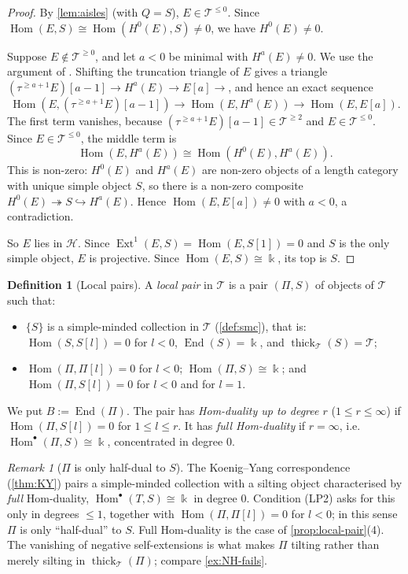 \documentclass[11pt,reqno]{amsart}
\theoremstyle{plain}
\theoremstyle{definition}
\newtheorem{definition}[theorem]{Definition}
\theoremstyle{remark}
\newtheorem{remark}[theorem]{Remark}
\newcommand{\kk}{\Bbbk}
\DeclareMathOperator{\Hom}{Hom}
\DeclareMathOperator{\End}{End}
\DeclareMathOperator{\Ext}{Ext}
\newcommand{\thick}[2][\cD]{\operatorname{thick}_{#1}(#2)}
\newcommand{\cD}{\mathcal{D}}
\newcommand{\cH}{\mathcal{H}}
\newcommand{\cT}{\mathcal{T}}
\begin{document}
\begin{proof}
By \cref{lem:aisles} (with $Q=S$), $E\in\cT^{\le0}$. Since $\Hom(E,S)\cong\Hom(H^0(E),S)\neq0$, we have $H^0(E)\ne0$.

Suppose $E\notin\cT^{\ge0}$, and let $a<0$ be minimal with $H^a(E)\ne0$. We use the argument of \cite[Lemma~3.12]{Bonf26}. Shifting the truncation triangle of $E$ gives a triangle $(\tau^{\ge a+1}E)[a-1]\to H^a(E)\to E[a]\to$, and hence an exact sequence
\[\Hom(E,(\tau^{\ge a+1}E)[a-1])\to\Hom(E,H^a(E))\to\Hom(E,E[a]).\]
The first term vanishes, because $(\tau^{\ge a+1}E)[a-1]\in\cT^{\ge2}$ and $E\in\cT^{\le0}$. Since $E\in\cT^{\le0}$, the middle term is
\[\Hom(E,H^a(E))\cong\Hom(H^0(E),H^a(E)).\]
This is non-zero: $H^0(E)$ and $H^a(E)$ are non-zero objects of a length category with unique simple object $S$, so there is a non-zero composite $H^0(E)\twoheadrightarrow S\hookrightarrow H^a(E)$. Hence $\Hom(E,E[a])\ne0$ with $a<0$, a contradiction.

So $E$ lies in $\cH$. Since $\Ext^1(E,S)=\Hom(E,S[1])=0$ and $S$ is the only simple object, $E$ is projective. Since $\Hom(E,S)\cong\kk$, its top is $S$.
\end{proof}

\begin{definition}[Local pairs]\label{def:local-pair}
A \emph{local pair} in $\cT$ is a pair $(\Pi,S)$ of objects of $\cT$ such that:
\begin{itemize}
\item[\textup{(LP1)}] $\{S\}$ is a simple-minded collection in $\cT$ (\cref{def:smc}), that is: $\Hom(S,S[l])=0$ for $l<0$, $\End(S)=\kk$, and $\thick[\cT]{S}=\cT$;
\item[\textup{(LP2)}] $\Hom(\Pi,\Pi[l])=0$ for $l<0$; $\Hom(\Pi,S)\cong\kk$; and $\Hom(\Pi,S[l])=0$ for $l<0$ and for $l=1$.
\end{itemize}
We put $B:=\End(\Pi)$. The pair has \emph{Hom-duality up to degree $r$} ($1\le r\le\infty$) if $\Hom(\Pi,S[l])=0$ for $1\le l\le r$. It has \emph{full Hom-duality} if $r=\infty$, i.e.\ $\Hom^\bullet(\Pi,S)\cong\kk$, concentrated in degree $0$.
\end{definition}

\begin{remark}[$\Pi$ is only half-dual to $S$]\label{rem:half-dual}
The Koenig--Yang correspondence (\cref{thm:KY}) pairs a simple-minded collection with a silting object characterised by \emph{full} Hom-duality, $\Hom^\bullet(T,S)\cong\kk$ in degree $0$. Condition (LP2) asks for this only in degrees $\le1$, together with $\Hom(\Pi,\Pi[l])=0$ for $l<0$; in this sense $\Pi$ is only ``half-dual'' to $S$. Full Hom-duality is the case of \cref{prop:local-pair}(4). The vanishing of negative self-extensions is what makes $\Pi$ tilting rather than merely silting in $\thick[\cT]{\Pi}$; compare \cref{ex:NH-fails}.
\end{remark}
\end{document}
